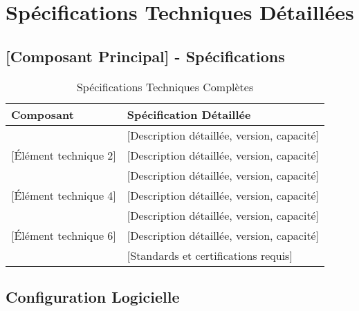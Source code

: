
\clearpage
\appendix

\setcounter{page}{1}

\section{Spécifications Techniques Détaillées}
\label{app:technical-specs}

\subsection{[Composant Principal] - Spécifications}

\begin{table}[H]
\centering
\caption{Spécifications Techniques Complètes}
\label{tab:technical-specs}
\begin{tabular}{|p{}|p{}|}
\hline
\rowcolor{DollaramaGreen!30}
\textbf{\color{white}Composant} & \textbf{\color{white}Spécification Détaillée} \\
\hline
[Élément technique 1] & [Description détaillée, version, capacité] \\
\hline
\rowcolor{gray!10}
[Élément technique 2] & [Description détaillée, version, capacité] \\
\hline
[Élément technique 3] & [Description détaillée, version, capacité] \\
\hline
\rowcolor{gray!10}
[Élément technique 4] & [Description détaillée, version, capacité] \\
\hline
[Élément technique 5] & [Description détaillée, version, capacité] \\
\hline
\rowcolor{gray!10}
[Élément technique 6] & [Description détaillée, version, capacité] \\
\hline
[Certification/Conformité] & [Standards et certifications requis] \\
\hline
\end{tabular}
\end{table}

\subsection{Configuration Logicielle}

